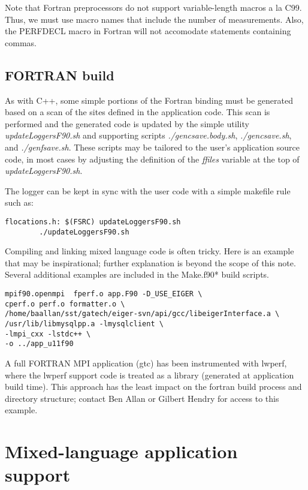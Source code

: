 \documentclass{article}
\begin{document}
Note that Fortran preprocessors do not support variable-length macros a la C99. Thus, we must use macro names that include the number of measurements. Also, the PERFDECL macro in Fortran will not
accomodate statements containing commas.

\subsection{FORTRAN build}
\label{sec:fbuild}
As with C++, some simple portions of the Fortran binding must be generated based on a scan of the sites defined in the application code. This scan is performed and the generated code is updated by the simple utility {\em updateLoggersF90.sh} and supporting scripts {\em ./gencsave.body.sh}, {\em ./gencsave.sh}, and {\em ./genfsave.sh}. These scripts may be tailored to the user's application source code, in most cases by adjusting the definition of the {\em ffiles} variable at the top of {\em updateLoggersF90.sh}.

The logger can be kept in sync with the user code with a simple makefile rule such as:
\begin{verbatim}
flocations.h: $(FSRC) updateLoggersF90.sh
        ./updateLoggersF90.sh
\end{verbatim}

Compiling and linking mixed language code is often tricky. Here is an example that may be inspirational; further explanation is beyond the scope of this note. Several additional examples are included in the Make.f90* build scripts.

\begin{verbatim}
mpif90.openmpi  fperf.o app.F90 -D_USE_EIGER \
cperf.o perf.o formatter.o \
/home/baallan/sst/gatech/eiger-svn/api/gcc/libeigerInterface.a \
/usr/lib/libmysqlpp.a -lmysqlclient \
-lmpi_cxx -lstdc++ \
-o ../app_u11f90
\end{verbatim}

A full FORTRAN MPI application (gtc) has been instrumented with lwperf, where the lwperf support code is treated as a library (generated at application build time). This approach has the least impact on the fortran build process and directory structure; contact Ben Allan or Gilbert Hendry for access to this example.


\section{Mixed-language application support}
\end{document}
